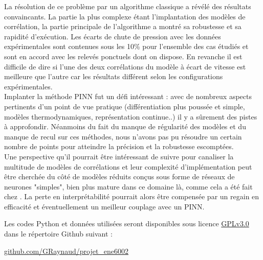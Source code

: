 La résolution de ce problème par un algorithme classique a révélé des résultats convaincants. La partie la plus complexe étant l'implantation des modèles de corrélation, la partie principale de l'algorithme a montré sa robustesse et sa rapidité d'exécution. Les écarts de chute de pression avec les données expérimentales sont contenues sous les 10\% pour l'ensemble des cas étudiés et sont en accord avec les relevés ponctuels dont on dispose. En revanche il est difficile de dire si l'une des deux corrélations du modèle à écart de vitesse est meilleure que l'autre car les résultats différent selon les configurations expérimentales.\\

Implanter la méthode PINN fut un défi intéressant : avec de nombreux aspects pertinents d'un point de vue pratique (différentiation plus poussée et simple, modèles thermodynamiques, représentation continue..) il y a sûrement des pistes à approfondir. Néanmoins du fait du manque de régularité des modèles et du manque de recul sur ces méthodes, nous n'avons pas pu résoudre un certain nombre de points pour atteindre la précision et la robustesse escomptées.\\

Une perspective qu'il pourrait être intéressant de suivre pour canaliser la multitude de modèles de corrélations et leur complexité d'implémentation peut être cherchée du côté de modèles réduits conçus sous forme de réseaux de neurones "simples", bien plus mature dans ce domaine là, comme cela a été fait chez \cite{alvarezdelcastilloNewVoidFraction2012}. La perte en interprétabilité pourrait alors être compensée par un regain en efficacité et éventuellement un meilleur couplage avec un PINN.\\

\medskip

Les codes Python et données utilisées seront disponibles sous licence \href{https://choosealicense.com/licenses/gpl-3.0/}{GPLv3.0} dans le répertoire Github suivant :
\begin{center}
    \href{https://github.com/GRaynaud/projet_ene6002}{github.com/GRaynaud/projet\_ene6002}
\end{center}